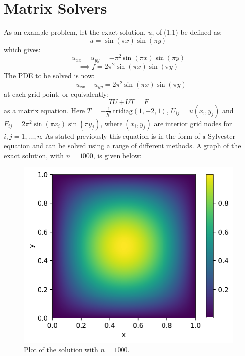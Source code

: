 \documentclass{article}
\numberwithin{equation}{section}
\begin{document}
\section{Matrix Solvers}
As an example problem, let the exact solution, $u$, of (1.1) be defined as:
\begin{equation} 
u = \sin{(\pi x)} \sin{(\pi y)}
\end{equation}
which gives:
\begin{equation} 
u_{xx} = u_{yy} = - \pi^2 \sin{(\pi x)} \sin{(\pi y)}
\end{equation}
\begin{equation}
\implies f = 2 \pi^2 \sin{(\pi x)} \sin {(\pi y)}
\end{equation}
The PDE to be solved is now:
\begin{equation}
-u_{xx} - u_{yy}  = 2 \pi^2 \sin{(\pi x)} \sin {(\pi y)}
\end{equation}
at each grid point, or equivalently:
	\begin{equation}
	TU + UT = F
	\end{equation}
as a matrix equation. Here $T=-\frac{1}{h^2} \, \text{tridiag}(1,-2,1)$, $U_{ij} = u(x_i, y_j)$ and $F_{ij} = 2 \pi^2 \sin{(\pi x_i)} \sin{(\pi y_j)}$, where $(x_i, y_j)$ are interior grid nodes for $i,j=1,\dots,n$. As stated previously this equation is in the form of a Sylvester equation and can be solved using a range of different methods. A graph of the exact solution, with $n=1000$, is given below:

\begin{figure}[H]
\includegraphics[scale=.5]{img/solution2.png}
\centering
\caption{Plot of the solution with $n=1000$.}
\end{figure} 
\end{document}
